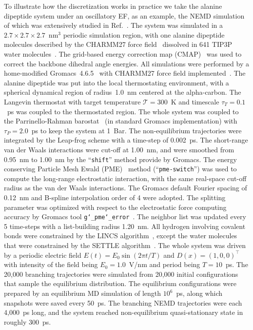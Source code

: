 \documentclass[aps, pre, preprint,unsortedaddress,a4paper,onecolumn,showkeys]{revtex4}
\newcommand{\redc}[1]{{\color{red} #1}}
\begin{document}
To illustrate how the discretization works in practice we take the alanine dipeptide system under an oscillatory EF,
as an example, the NEMD simulation of which was
extensively studied in Ref.~\cite{wang2014exploring}.
The system was simulated in a $2.7\times 2.7\times 2.7$~$\textrm{nm}^3$ periodic simulation
region, with one alanine dipeptide molecules described by the CHARMM27 force field~\cite{foloppe2000all} dissolved in 641 TIP3P water molecules~\cite{jorgensen1983comparison}.
The grid-based energy correction map (CMAP)~\cite{mackerell2004extending} was used
to correct the backbone dihedral angle energies.
All simulations were performed by a home-modified
Gromacs~4.6.5~\cite{pronk2013gromacs} with CHARMM27 force field implemented~\cite{bjelkmar2010implementation}.
The alanine dipeptide was put into the local thermostating
environment, with a spherical dynamical region of radius~1.0~nm
centered at the alpha-carbon.
The Langevin thermostat with target temperature $\mathcal T = 300$~K
and timescale $\tau_T = 0.1$~ps was
coupled to the thermostated region.
The whole system was coupled to the Parrinello-Rahman barostat~\cite{parrinello1981polymorphic} (in standard Gromacs implementation) with $\tau_P = 2.0$~ps to
keep the system at 1~Bar. The non-equilibrium trajectories
were integrated by the Leap-frog scheme with a time-step of 0.002~ps.
The short-range van der Waals interactions were cut-off at 1.00~nm, and were smoothed from
0.95~nm to 1.00~nm by the ``\texttt{shift}'' method provide by Gromacs.
The energy conserving 
Particle Mesh Ewald (PME)~\cite{darden1993pme, essmann1995spm} method (``\texttt{pme-switch}'') was
used to compute the long-range electrostatic interaction,
with the same real-space cut-off radius as the van der Waals interactions.
The Gromacs default Fourier spacing of 0.12~nm and B-spline interpolation order of 4 were adopted.
The splitting
parameter was optimized with respect to the electrostatic force computing
accuracy by Gromacs tool \texttt{g\char`_pme\char`_error}~\cite{wang2010optimizing}.
The neighbor list was updated every 5 time-steps with a list-building radius 1.20~nm.
All hydrogen involving covalent bonds were constrained by the LINCS algorithm~\cite{hess1997lincs}, except the water molecules that were constrained by the SETTLE algorithm~\cite{miyamoto2004settle}.
The whole system was driven by a periodic electric field
$E(t) = E_0\sin(2\pi t/T)$ and $D(x) = (1,0,0)^{\top}$
with intensity of the field being $E_0 = 1.0$~V/nm and period being
$T = 10$~ps.
The 20,000 branching trajectories were simulated from 20,000
initial configurations that sample the equilibrium distribution.
The equilibrium configurations were prepared by an equilibrium MD simulation
of length $10^6$~ps, along which snapshots were saved every 50~ps.
The branching NEMD
trajectories were each 4,000~ps long, and the system reached
non-equilibrium quasi-stationary state in roughly 300~ps.
\end{document}
